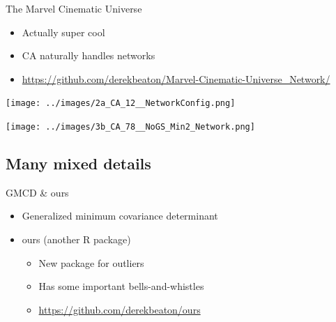 \documentclass[
  ignorenonframetext,
]{beamer}
\providecommand{\tightlist}{%
  \setlength{\itemsep}{0pt}\setlength{\parskip}{0pt}}
\begin{document}
\begin{frame}{The Marvel Cinematic Universe}
\protect\hypertarget{the-marvel-cinematic-universe}{}

\begin{itemize}[<+->]
\tightlist
\item
  Actually super cool
\item
  CA naturally handles networks
\item
  \url{https://github.com/derekbeaton/Marvel-Cinematic-Universe_Network/}
\end{itemize}

\end{frame}

\begin{frame}

\texttt{[image: ../images/2a\_CA\_12\_\_NetworkConfig.png]}

\end{frame}

\begin{frame}

\texttt{[image: ../images/3b\_CA\_78\_\_NoGS\_Min2\_Network.png]}

\end{frame}

\hypertarget{many-mixed-details}{%
\subsection{Many mixed details}\label{many-mixed-details}}

\begin{frame}{GMCD \& ours}
\protect\hypertarget{gmcd-ours}{}

\begin{itemize}[<+->]
\tightlist
\item
  Generalized minimum covariance determinant
\item
  ours (another R package)

  \begin{itemize}[<+->]
  \tightlist
  \item
    New package for outliers
  \item
    Has some important bells-and-whistles
  \item
    \url{https://github.com/derekbeaton/ours}
  \end{itemize}
\end{itemize}

\end{frame}
\end{document}
